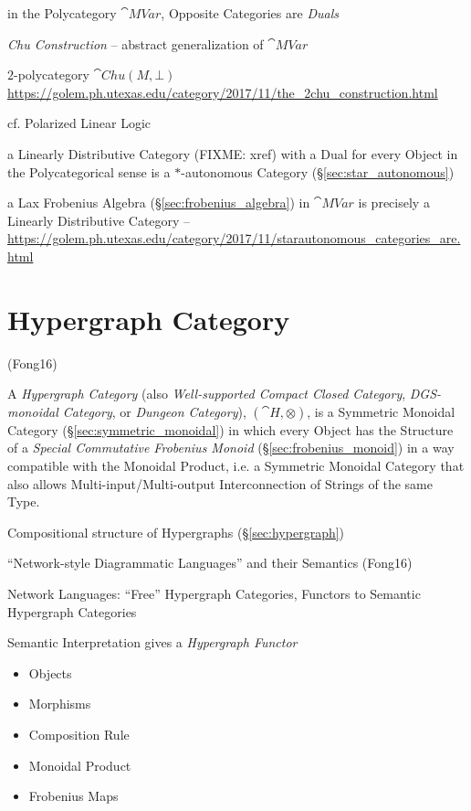in the Polycategory $\cat{MVar}$, Opposite Categories are \emph{Duals}


\emph{Chu Construction} -- abstract generalization of $\cat{MVar}$

$2$-polycategory $\cat{Chu}(M,\bot)$
\url{https://golem.ph.utexas.edu/category/2017/11/the_2chu_construction.html}

cf. Polarized Linear Logic

a Linearly Distributive Category (FIXME: xref) with a Dual for every Object in
the Polycategorical sense is a $*$-autonomous Category
(\S\ref{sec:star_autonomous})

a Lax Frobenius Algebra (\S\ref{sec:frobenius_algebra}) in $\cat{MVar}$ is
precisely a Linearly Distributive Category
--\url{https://golem.ph.utexas.edu/category/2017/11/starautonomous_categories_are.html}



\section{Hypergraph Category}\label{sec:hypergraph_category}

(Fong16)

A \emph{Hypergraph Category} (also \emph{Well-supported Compact Closed
  Category}, \emph{DGS-monoidal Category}, or \emph{Dungeon
  Category}), $(\cat{H}, \otimes)$, is a Symmetric Monoidal Category
(\S\ref{sec:symmetric_monoidal}) in which every Object has the
Structure of a \emph{Special Commutative Frobenius Monoid}
(\S\ref{sec:frobenius_monoid}) in a way compatible with the Monoidal
Product, i.e. a Symmetric Monoidal Category that also allows
Multi-input/Multi-output Interconnection of Strings of the same Type.

Compositional structure of Hypergraphs (\S\ref{sec:hypergraph})

``Network-style Diagrammatic Languages'' and their Semantics (Fong16)

Network Languages: ``Free'' Hypergraph Categories,
Functors to Semantic Hypergraph Categories

Semantic Interpretation gives a \emph{Hypergraph Functor}

\begin{itemize}
  \item Objects
  \item Morphisms
  \item Composition Rule
  \item Monoidal Product
  \item Frobenius Maps
\end{itemize}


